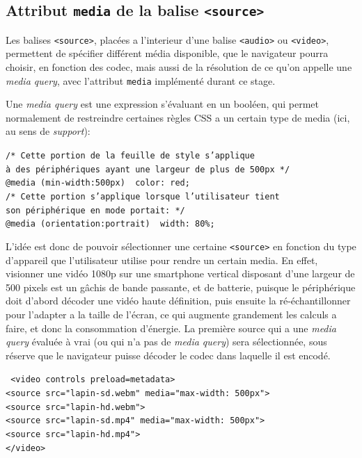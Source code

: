 \documentclass[a4paper,10pt]{article}
\newcommand{\cc}[1]{\texttt{#1}}
\begin{document}
\begin{multicols}{2}
  \section{Attribut \cc{media} de la balise \cc{<source>}}

  Les balises \cc{<source>}, placées a l'interieur d'une balise \cc{<audio>} ou
  \cc{<video>}, permettent de spécifier différent média disponible, que le
  navigateur pourra choisir, en fonction des codec, mais aussi de la résolution
  de ce qu'on appelle une \emph{media query}, avec l'attribut \cc{media} implémenté
  durant ce stage.

  Une \emph{media query} est une expression s'évaluant en un booléen, qui permet
  normalement de restreindre certaines règles CSS a un certain type de media
  (ici, au sens de \emph{support}):

  \noindent
  {\footnotesize
  \cc{/* Cette portion de la feuille de style s'applique\\
     à des périphériques ayant une largeur de plus de 500px */\\
     @media (min-width:500px) { color: red; }\\
     /* Cette portion s'applique lorsque l'utilisateur tient\\
     son périphérique en mode portait: */ \\
     @media (orientation:portrait) { width: 80\%; }
  }}

  L'idée est donc de pouvoir sélectionner une certaine \cc{<source>} en fonction
  du type d'appareil que l'utilisateur utilise pour rendre un certain media. En
  effet, visionner une vidéo 1080p sur une smartphone vertical disposant d'une
  largeur de 500 pixels est un gâchis de bande passante, et de batterie, puisque
  le périphérique doit d'abord décoder une vidéo haute définition, puis ensuite
  la ré-échantillonner pour l'adapter a la taille de l'écran, ce qui augmente
  grandement les calculs a faire, et donc la consommation d'énergie. La première
  source qui a une \emph{media query} évaluée à vrai (ou qui n'a pas de \emph{media
  query}) sera sélectionnée, sous réserve que le navigateur puisse décoder le
  codec dans laquelle il est encodé.

  \noindent
  {\footnotesize
    \cc{%
      <video controls preload=metadata>\\
      <source src="lapin-sd.webm" media="max-width: 500px">\\
      <source src="lapin-hd.webm">\\
      <source src="lapin-sd.mp4" media="max-width: 500px">\\
      <source src="lapin-hd.mp4">\\
      </video>\\
    }
  }


\end{multicols}
\end{document}
